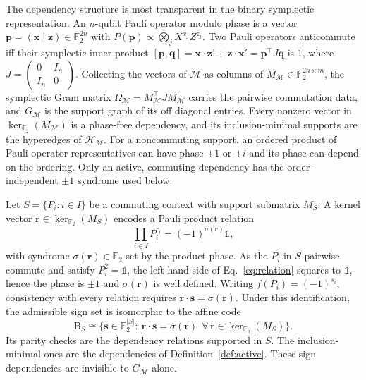 \documentclass[10pt,aps,pra,twocolumn,floatfix,nofootinbib,superscriptaddress,longbibliography]{revtex4-2}
\newcommand{\Ftwo}{\mathbb F_2}
\newcommand{\Mcal}{\mathcal M}
\newcommand{\Hcal}{\mathcal H}
\newcommand{\Bset}{\mathrm B}
\providecommand{\mathbm}[1]{\bm{#1}}
\begin{document}
\begin{bibunit}[apsrev4-2]
		The dependency structure is most transparent in the binary symplectic representation.
		An $n$-qubit Pauli operator modulo phase is a vector $\mathbm{p}=(\mathbm{x}\mid \mathbm{z})\in\Ftwo^{2n}$ with $P(\mathbm{p})\propto\bigotimes_j X^{x_j}Z^{z_j}$.
		Two Pauli operators anticommute iff their symplectic inner product $[\mathbm{p},\mathbm{q}]=\mathbm{x}\cdot \mathbm{z}'+\mathbm{z}\cdot \mathbm{x}'=\mathbm{p}^\top J \mathbm{q}$ is $1$, where $J=\left(\begin{smallmatrix}0&I_n\\I_n&0\end{smallmatrix}\right)$.
		Collecting the vectors of $\Mcal$ as columns of $M_\Mcal\in\Ftwo^{2n\times m}$, the symplectic Gram matrix $\Omega_\Mcal=M_\Mcal^\top J M_\Mcal$ carries the pairwise commutation data, and $G_\Mcal$ is the support graph of its off diagonal entries.
		Every nonzero vector in $\ker_{\Ftwo}(M_\Mcal)$ is a phase-free dependency, and its inclusion-minimal supports are the hyperedges of $\Hcal_\Mcal$.
		For a noncommuting support, an ordered product of Pauli operator representatives can have phase $\pm1$ or $\pm i$ and its phase can depend on the ordering.
		Only an active, commuting dependency has the order-independent $\pm1$ syndrome used below.
		
		Let $S=\{P_i:i\in I\}$ be a commuting context with support submatrix $M_S$.
		A kernel vector $\mathbm{r}\in\ker_{\Ftwo}(M_S)$ encodes a Pauli product relation
		\begin{equation}
			\prod_{i\in I}P_i^{r_i}=(-1)^{\sigma(\mathbm{r})}\mathbb{1},
			\label{eq:relation}
		\end{equation}
		with syndrome $\sigma(\mathbm{r})\in\Ftwo$ set by the product phase.
		As the $P_i$ in $S$ pairwise commute and satisfy $P_i^2=\mathbb{1}$, the left hand side of Eq.~\eqref{eq:relation} squares to $\mathbb{1}$, hence the phase is $\pm1$ and $\sigma(\mathbm{r})$ is well defined.
		Writing $f(P_i)=(-1)^{s_i}$, consistency with every relation requires $\mathbm{r}\cdot \mathbm{s}=\sigma(\mathbm{r})$.
		Under this identification, the admissible sign set is isomorphic to the affine code
		\begin{equation}
			\Bset_S\cong\{\mathbm{s}\in\Ftwo^{|S|}:\ \mathbm{r}\cdot \mathbm{s}=\sigma(\mathbm{r})\ \ \forall\,\mathbm{r}\in\ker_{\Ftwo}(M_S)\}.
			\label{eq:sign-code}
		\end{equation}
		Its parity checks are the dependency relations supported in $S$.
		The inclusion-minimal ones are the dependencies of Definition~\ref{def:active}.
		These sign dependencies are invisible to $G_\Mcal$ alone.
		

\end{bibunit}
\end{document}
